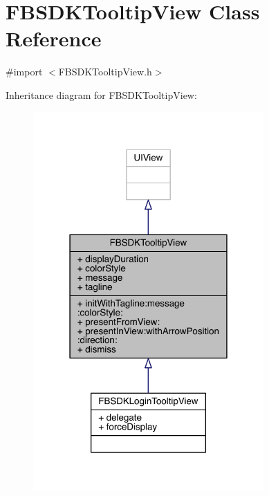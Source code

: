 \hypertarget{interface_f_b_s_d_k_tooltip_view}{\section{F\-B\-S\-D\-K\-Tooltip\-View Class Reference}
\label{interface_f_b_s_d_k_tooltip_view}
}


{\ttfamily \#import $<$F\-B\-S\-D\-K\-Tooltip\-View.\-h$>$}



Inheritance diagram for F\-B\-S\-D\-K\-Tooltip\-View\-:
\nopagebreak
\begin{figure}[H]
\begin{center}
\leavevmode
\includegraphics[width=250pt]{interface_f_b_s_d_k_tooltip_view__inherit__graph}
\end{center}
\end{figure}



